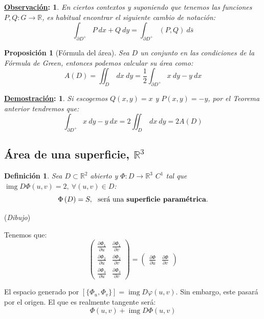 \documentclass[10pt,a4paper,openright]{book}
\theoremstyle{break}
\newtheorem*{defi}{Definición}
\newtheorem*{prop}{Proposición}
\newtheorem*{demo}{\underline{Demostración}:}
\newtheorem*{obs}{\underline{Observación}:}
\DeclareMathOperator{\img}{img}
\newcommand{\dif}[1]{\ d#1}
\begin{document}
\begin{obs}
En ciertos contextos y suponiendo que tenemos las funciones $P, Q: G \rightarrow \mathbb{R}$, es habitual encontrar el siguiente cambio de notación:
$$\int_{\partial D^+} P \dif{x} + Q \dif{y} = \int_{\partial D^+} (P, Q) \dif{\bar{s}}$$
\end{obs}

\begin{prop}[Fórmula del área]
Sea $D$ un conjunto en las condiciones de la Fórmula de Green, entonces podemos calcular su área como:
$$A\left(D\right)=\iint_{D} \dif{x} \dif{y} = \frac{1}{2}\int_{\partial D^+} x \dif{y} - y \dif{x}$$
\end{prop}
\begin{demo}
Si escogemos $Q\left( x, y \right) = x$ y $P\left( x, y \right) = -y$, por el Teorema anterior tendremos que:
$$\int_{\partial D^+} x \dif{y} - y \dif{x} = 2\iint_{D} \dif{x} \dif{y} = 2 A\left(D\right)$$
\end{demo}

\subsection*{Área de una superficie, $\mathbb{R}^3$}%
\label{sub:area_de_una_superficie}
\begin{defi}
Sea $D \subset  \mathbb{R}^2$ abierto y $\Phi: D \rightarrow \mathbb{R}^3$ $C^1$ tal que $\img D \Phi\left( u, v \right) = 2,\ \forall \left( u, v \right) \in D$: 
$$\Phi\left( D \right) = S,\ \text{ será una \textbf{superficie paramétrica}.}$$
\end{defi}
(\textit{Dibujo})

Tenemos que: 
$$\begin{pmatrix} \frac{\partial \Phi_1}{\partial u} & \frac{\partial \Phi_1}{\partial v} \\
\frac{\partial \Phi_2}{\partial u} & \frac{\partial \Phi_2}{\partial v} \\ 
\frac{\partial \Phi_3}{\partial u} & \frac{\partial \Phi_3}{\partial v} \end{pmatrix} = \begin{pmatrix} \frac{\partial \Phi}{\partial u} & \frac{\partial \Phi}{\partial v} \end{pmatrix} $$

El espacio generado por $\left[ \{\Phi_u, \Phi_v\} \right] = \img D \varphi \left( u, v \right)$. Sin embargo, este pasará por el origen. El que es realmente tangente será: 
$$\boxed{\Phi \left( u, v \right) + \img D \Phi \left( u, v \right)}$$
\end{document}
